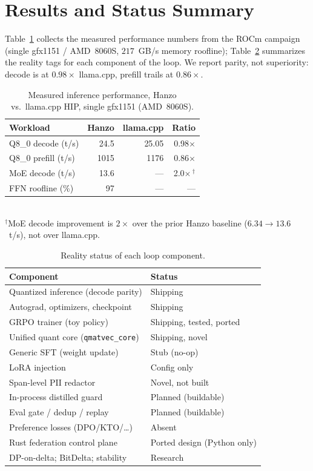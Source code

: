 \documentclass[11pt]{article}
\begin{document}
\section{Results and Status Summary}
\label{sec:results}

Table~\ref{tab:perf} collects the measured performance numbers from the ROCm campaign (single gfx1151 / AMD~8060S, $217$~GB/s memory roofline); Table~\ref{tab:status} summarizes the reality tags for each component of the loop. We report parity, not superiority: decode is at $0.98\times$ llama.cpp, prefill trails at $0.86\times$.

\begin{table}[t]
\centering
\caption{Measured inference performance, Hanzo vs.\ llama.cpp HIP, single gfx1151 (AMD~8060S).}
\label{tab:perf}
\small
\begin{tabular}{@{}lrrr@{}}
\toprule
\textbf{Workload} & \textbf{Hanzo} & \textbf{llama.cpp} & \textbf{Ratio} \\
\midrule
Q8\_0 decode (t/s)   & 24.5   & 25.05  & 0.98$\times$ \\
Q8\_0 prefill (t/s)  & 1015   & 1176   & 0.86$\times$ \\
MoE decode (t/s)     & 13.6   & ---    & 2.0$\times$\,$^{\dagger}$ \\
FFN roofline (\%)    & 97     & ---    & --- \\
\bottomrule
\end{tabular}
\\[2pt]
{\footnotesize $^{\dagger}$MoE decode improvement is $2\times$ over the prior Hanzo baseline ($6.34 \to 13.6$~t/s), not over llama.cpp.}
\end{table}

\begin{table}[t]
\centering
\caption{Reality status of each loop component.}
\label{tab:status}
\small
\begin{tabular}{@{}ll@{}}
\toprule
\textbf{Component} & \textbf{Status} \\
\midrule
Quantized inference (decode parity) & Shipping \\
Autograd, optimizers, checkpoint    & Shipping \\
GRPO trainer (toy policy)           & Shipping, tested, ported \\
Unified quant core (\texttt{qmatvec\_core}) & Shipping, novel \\
Generic SFT (weight update)         & Stub (no-op) \\
LoRA injection                      & Config only \\
Span-level PII redactor             & Novel, not built \\
In-process distilled guard          & Planned (buildable) \\
Eval gate / dedup / replay          & Planned (buildable) \\
Preference losses (DPO/KTO/\ldots)  & Absent \\
Rust federation control plane       & Ported design (Python only) \\
DP-on-delta; BitDelta; stability    & Research \\
\bottomrule
\end{tabular}
\end{table}
\end{document}
